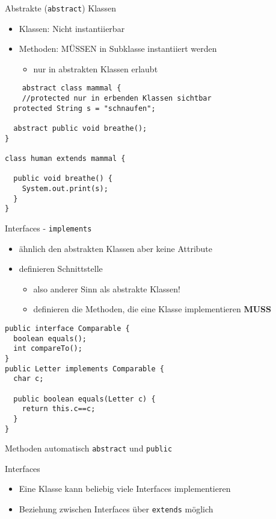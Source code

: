 \documentclass[18pt]{beamer}
\begin{document}
\begin{frame}[fragile]{Abstrakte (\lstinline{abstract}) Klassen}
\begin{itemize}
	\item Klassen: Nicht instantiierbar
	\item Methoden: MÜSSEN in Subklasse instantiiert werden
	\begin{itemize}
		\item nur in abstrakten Klassen erlaubt \pause
	\end{itemize}
\end{itemize}
\begin{lstlisting}
	abstract class mammal {
	//protected nur in erbenden Klassen sichtbar
  protected String s = "schnaufen";

  abstract public void breathe();
}

class human extends mammal {

  public void breathe() {
    System.out.print(s);
  }
}
\end{lstlisting}
\end{frame}

\begin{frame}[fragile]{Interfaces - \lstinline{implements}}
\begin{itemize}
	\item ähnlich den abstrakten Klassen aber keine Attribute \pause
	\item definieren Schnittstelle  
	\begin{itemize}
		\item also anderer Sinn als abstrakte Klassen!  \pause
		\item definieren die Methoden, die eine Klasse implementieren \textbf{MUSS}
	\end{itemize}
\end{itemize}
\begin{lstlisting}[mathescape]
public interface Comparable {
  boolean equals();
  int compareTo();
}
public Letter implements Comparable {
  char c;
	
  public boolean equals(Letter c) {
    return this.c==c;
  }
}
\end{lstlisting} \pause
Methoden automatisch \lstinline{abstract} und \lstinline{public}
\end{frame}

\begin{frame}[fragile]{Interfaces}
\begin{itemize}
	\item Eine Klasse kann beliebig viele Interfaces implementieren \pause
	\item Beziehung zwischen Interfaces über \lstinline{extends} möglich \pause
\end{itemize}
\end{frame}
\end{document}

